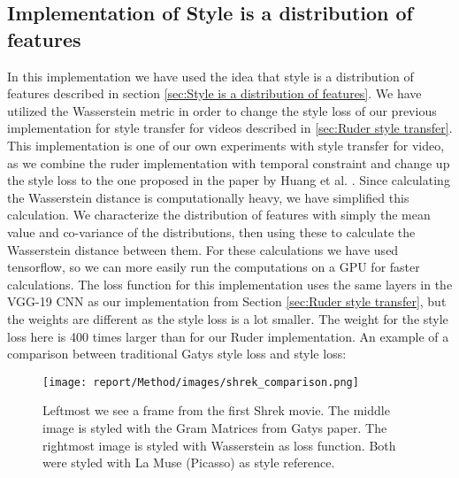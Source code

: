 \subsection{Implementation of Style is a distribution of features}
In this implementation we have used the idea that style is a distribution of features described in section \ref{sec:Style is a distribution of features}. We have utilized the Wasserstein metric in order to change the style loss of our previous implementation for style transfer for videos described in \ref{sec:Ruder style transfer}. This implementation is one of our own experiments with style transfer for video, as we combine the ruder implementation with temporal constraint and change up the style loss to the one proposed in the paper by Huang et al. \cite{Huang:1}. 
\newline\newline
Since calculating the Wasserstein distance is computationally heavy, we have simplified this calculation. We characterize the distribution of features with simply the mean value and co-variance of the distributions, then using these to calculate the Wasserstein distance between them. For these calculations we have used tensorflow, so we can more easily run the computations on a GPU for faster calculations.\newline\newline
The loss function for this implementation uses the same layers in the VGG-19 CNN as our implementation from Section \ref{sec:Ruder style transfer}, but the weights are different as the style loss is a lot smaller. The weight for the style loss here is 400 times larger than for our Ruder implementation. An example of a comparison between traditional Gatys \cite{Gatys:1} style loss and \cite{Huang:1} style loss: \newline
\begin{figure}[!ht]
\begin{center}
\texttt{[image: report/Method/images/shrek\_comparison.png]}
\caption{Leftmost we see a frame from the first Shrek movie. The middle image is styled with the Gram Matrices from Gatys paper. The rightmost image is styled with Wasserstein as loss function. Both were styled with La Muse (Picasso) as style reference.}
\label{fig:architecture}
\end{center}
\end{figure}